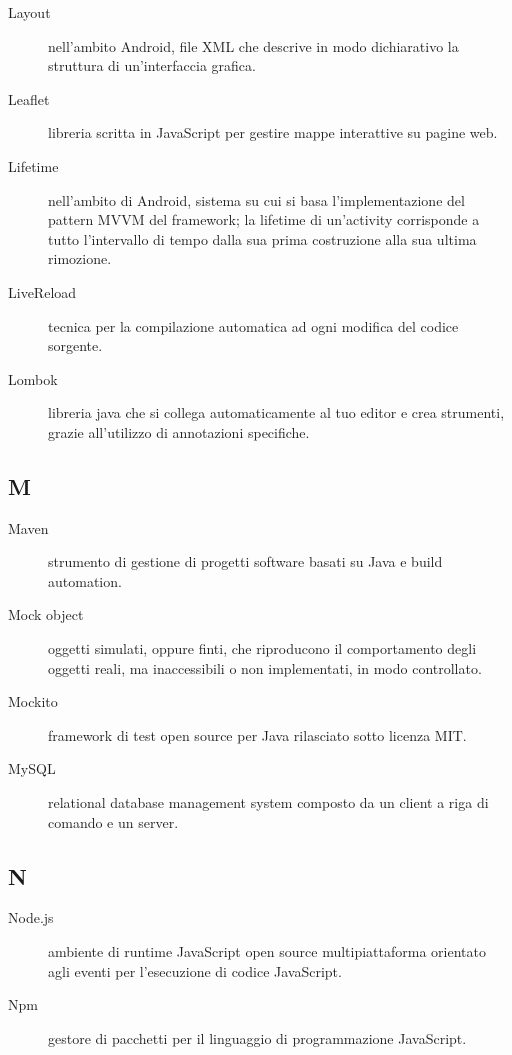 \documentclass[../manuale-manutentore.tex]{subfiles}
\begin{document}
\begin{description}
    \item[Layout] nell'ambito Android, file XML che descrive in modo dichiarativo la struttura di un'interfaccia grafica.
    \item[Leaflet] libreria scritta in JavaScript per gestire mappe interattive su pagine web.
    \item[Lifetime] nell'ambito di Android, sistema su cui si basa l'implementazione del pattern MVVM del framework; la lifetime di un'activity corrisponde a tutto l'intervallo di tempo dalla sua prima costruzione alla sua ultima rimozione.
    \item[LiveReload] tecnica per la compilazione automatica ad ogni modifica del codice sorgente.
    \item[Lombok] libreria java che si collega automaticamente al tuo editor e crea strumenti, grazie all'utilizzo di annotazioni specifiche.
\end{description}

\subsection{M}

\begin{description}
    \item[Maven] strumento di gestione di progetti software basati su Java e build automation.
    \item[Mock object] oggetti simulati, oppure finti, che riproducono il comportamento degli oggetti reali, ma inaccessibili o non implementati, in modo controllato.
    \item[Mockito] framework di test open source per Java rilasciato sotto licenza MIT\@.
    \item[MySQL] relational database management system composto da un client a riga di comando e un server.
\end{description}

\subsection{N}

\begin{description}
  \item[Node.js] ambiente di runtime JavaScript open source multipiattaforma orientato agli eventi per l'esecuzione di codice JavaScript.
  \item[Npm] gestore di pacchetti per il linguaggio di programmazione JavaScript.
\end{description}
\end{document}
